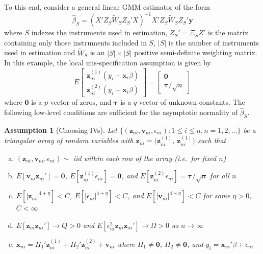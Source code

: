 \documentclass[12pt]{article}
\newtheorem{assump}{Assumption}[section]
\theoremstyle{definition}
\begin{document}
To this end, consider a general linear GMM estimator of the form
$$\widehat{\beta}_S = (X'Z_S \widetilde{W}_S Z_S' X)^{-1}X'Z_S \widetilde{W}_S  Z_S' \mathbf{y}$$
where $S$ indexes the instruments used in estimation, $Z_S'  = \Xi_S Z'$ is the matrix containing only those instruments included in $S$, $|S|$ is the number of instruments used in estimation and $\widetilde{W}_S$ is an $|S|\times|S|$ positive semi-definite weighting matrix. In this example, the local mis-specification assumption is given by
\begin{equation}
  E\left[\begin{array}
    {c}
    \textbf{z}_{ni}^{(1)} (y_i - \textbf{x}_i\beta) \\
    \textbf{z}_{ni}^{(2)} (y_i - \textbf{x}_i \beta)
\end{array}\right] = \left[
  \begin{array}
    {c}
    \textbf{0} \\ \boldsymbol{\tau}/\sqrt{n}
  \end{array}
\right]
\end{equation}
where $\mathbf{0}$ is a $p$-vector of zeros, and $\boldsymbol{\tau}$ is a $q$-vector of unknown constants. 
The following low-level conditions are sufficient for the asymptotic normality of $\widehat{\beta}_S$.

\begin{assump}[Choosing IVs]
\label{assump:chooseIV} 
	Let $\{(\mathbf{z}_{ni}, \mathbf{v}_{ni}, \epsilon_{ni})\colon 1\leq i \leq n, n = 1, 2, \hdots\}$ be a triangular array of random variables with $\mathbf{z}_{ni} = (\mathbf{z}_{ni}^{(1)}$, $\mathbf{z}_{ni}^{(1)})$ such that
	\begin{enumerate}[(a)]
		\item $(\mathbf{z}_{ni}, \mathbf{v}_{ni}, \epsilon_{ni}) \sim$ iid within each row of the array (i.e.\ for fixed $n$)
		\item $E[\mathbf{v}_{ni}\mathbf{z}_{ni}']=\mathbf{0}$, $E[\mathbf{z}^{(1)}_{ni} \epsilon_{ni}]=\mathbf{0}$, and $E[\mathbf{z}^{(2)}_{ni} \epsilon_{ni}] = \boldsymbol{\tau}/\sqrt{n}$ for all $n$
		\item $E[\left|\mathbf{z}_{ni}\right|^{4+\eta}] <C$, $E[\left|\epsilon_{ni}\right|^{4+\eta}] <C$, and $E[\left|\mathbf{v}_{ni}\right|^{4+\eta}] <C$ for some $\eta >0$, $C <\infty$
		\item $E[\mathbf{z}_{ni} \mathbf{z}_{ni}'] \rightarrow Q>0$ and $E[\epsilon_{ni}^2 \mathbf{z}_{ni} \mathbf{z}_{ni}'] \rightarrow \Omega >0$ as $n\rightarrow \infty$
		\item $\mathbf{x}_{ni} =  \Pi_1' \mathbf{z}_{ni}^{(1)} + \Pi_2'\mathbf{z}_{ni}^{(2)} + \mathbf{v}_{ni}$ where $\Pi_1 \neq \mathbf{0}$, $\Pi_2 \neq \mathbf{0}$, and $y_i = \mathbf{x}_{ni}' \beta +  \epsilon_{ni}$
	\end{enumerate}
\end{assump}
\end{document}

